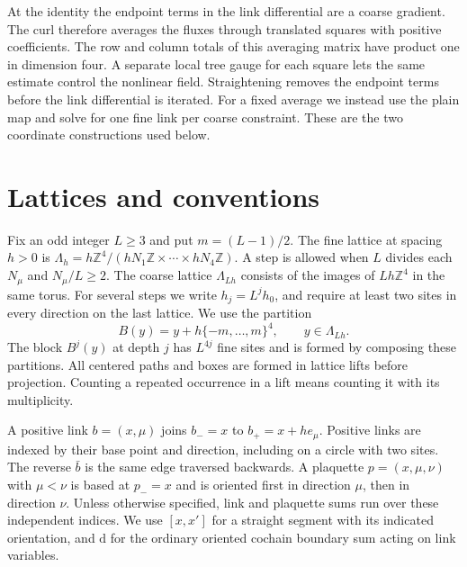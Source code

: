 \documentclass[11pt,letterpaper,reqno]{amsart}
\numberwithin{equation}{section}
\theoremstyle{definition}
\theoremstyle{remark}
\begin{document}
At the identity the endpoint terms in the link differential are a
coarse gradient. The curl therefore averages the fluxes through
translated squares with positive coefficients. The row and column
totals of this averaging matrix have product one in dimension four.
A separate local tree gauge for each square lets the same estimate
control the nonlinear field. Straightening removes the endpoint
terms before the link differential is iterated. For a fixed average
we instead use the plain map and solve for one fine link per coarse
constraint. These are the two coordinate constructions used below.

\section{Lattices and conventions}\label{sec:lattice}

Fix an odd integer \(L\ge3\) and put \(m=(L-1)/2\). The fine lattice
at spacing \(h>0\) is
\(\Lambda_h=h\mathbb Z^4/(hN_1\mathbb Z\times\cdots\times hN_4\mathbb Z)\).
A step is allowed when \(L\) divides each \(N_\mu\) and
\(N_\mu/L\ge2\). The coarse lattice \(\Lambda_{Lh}\) consists of the
images of \(Lh\mathbb Z^4\) in the same torus. For several steps we
write \(h_j=L^jh_0\), and require at least two sites in every
direction on the last lattice. We use the partition
\[
 B(y)=y+h\{-m,\ldots,m\}^4,\qquad y\in\Lambda_{Lh}.
\]
The block \(B^j(y)\) at depth \(j\) has \(L^{4j}\) fine sites and is
formed by composing these partitions. All centered paths and boxes
are formed in lattice lifts before projection. Counting a repeated
occurrence in a lift means counting it with its multiplicity.

A positive link \(b=(x,\mu)\) joins \(b_-=x\) to \(b_+=x+he_\mu\).
Positive links are indexed by their base point and direction,
including on a circle with two sites. The reverse \(\bar b\)
is the same edge traversed backwards. A plaquette \(p=(x,\mu,\nu)\)
with \(\mu<\nu\) is based at \(p_-=x\) and is oriented first in
direction \(\mu\), then in direction \(\nu\). Unless otherwise
specified, link and plaquette sums run over these independent
indices. We use \([x,x']\) for a straight segment with its indicated
orientation, and \(\mathrm d\) for the ordinary oriented cochain
boundary sum acting on link variables.
\end{document}
